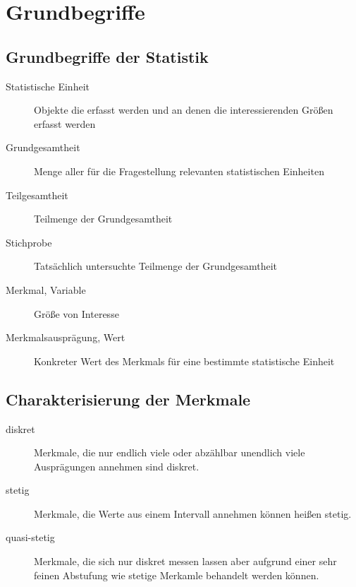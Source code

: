 






\chapter{Grundbegriffe}
\section{Grundbegriffe der Statistik}
\begin{description}
	\item[Statistische Einheit]
	Objekte die erfasst werden und an denen die interessierenden Größen erfasst werden

	\item[Grundgesamtheit]
	Menge aller für die Fragestellung relevanten statistischen Einheiten

	\item[Teilgesamtheit]
	Teilmenge der Grundgesamtheit

	\item[Stichprobe]
	Tatsächlich untersuchte Teilmenge der Grundgesamtheit

	\item[Merkmal, Variable]
	Größe von Interesse

	\item[Merkmalsausprägung, Wert]
	Konkreter Wert des Merkmals für eine bestimmte statistische Einheit
\end{description}

\section{Charakterisierung der Merkmale}
\begin{description}
	\item[diskret]
	Merkmale, die nur endlich viele oder abzählbar unendlich viele Ausprägungen annehmen sind diskret.
	\item[stetig]
	Merkmale, die Werte aus einem Intervall annehmen können heißen stetig.
	\item[quasi-stetig]
	Merkmale, die sich nur diskret messen lassen aber aufgrund einer sehr feinen Abstufung wie stetige Merkamle behandelt werden können.
\end{description}

